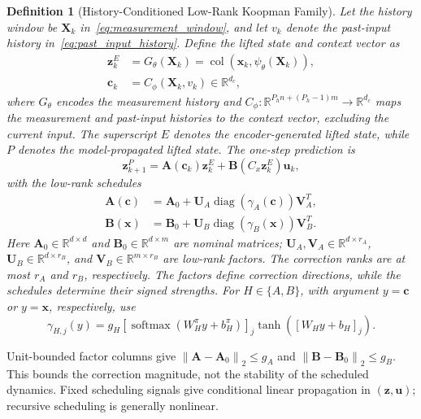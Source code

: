 \documentclass[journal]{IEEEtran}
\newcommand{\vx}{\mathbf{x}}
\newcommand{\vu}{\mathbf{u}}
\newcommand{\vz}{\mathbf{z}}
\newcommand{\vc}{\mathbf{c}}
\newcommand{\mA}{\mathbf{A}}
\newcommand{\mB}{\mathbf{B}}
\newcommand{\mU}{\mathbf{U}}
\newcommand{\mV}{\mathbf{V}}
\newcommand{\mX}{\mathbf{X}}
\newcommand{\R}{\mathbb{R}}
\newcommand{\norm}[1]{\left\lVert #1\right\rVert}
\newcommand{\col}{\operatorname{col}}
\begin{document}
\newtheorem{definition}{Definition}
\begin{definition}[History-Conditioned Low-Rank Koopman Family]
\label{def:hcltk}
Let the history window be $\mX_k$ in~\eqref{eq:measurement_window}, and let $v_k$ denote the past-input history in~\eqref{eq:past_input_history}. Define the lifted state and context vector as
\begin{equation}
\begin{aligned}
\vz_k^E&=G_\theta(\mX_k)=\col(\vx_k,\psi_\theta(\mX_k)),\\
\vc_k&=C_\phi(\mX_k,v_k)\in\R^{d_c},
\end{aligned}
\label{eq:context_vector}
\end{equation}
where $G_\theta$ encodes the measurement history and $C_\phi:\R^{P_hn+(P_h-1)m}\to\R^{d_c}$ maps the measurement and past-input histories to the context vector, excluding the current input. The superscript $E$ denotes the encoder-generated lifted state, while $P$ denotes the model-propagated lifted state. The one-step prediction is
\begin{equation}
\vz_{k+1}^P=\mA(\vc_k)\vz_k^E+\mB(C_x\vz_k^E)\vu_k,
\label{eq:scheduled_predictor}
\end{equation}
with the low-rank schedules
\begin{align}
\mA(\vc)&=\mA_0+\mU_A\operatorname{diag}(\gamma_A(\vc))\mV_A^T,
\label{eq:transition_schedule}\\
\mB(\vx)&=\mB_0+\mU_B\operatorname{diag}(\gamma_B(\vx))\mV_B^T.
\label{eq:low_rank_schedules}
\end{align}
Here $\mA_0\in\R^{d\times d}$ and $\mB_0\in\R^{d\times m}$ are nominal matrices; $\mU_A,\mV_A\in\R^{d\times r_A}$, $\mU_B\in\R^{d\times r_B}$, and $\mV_B\in\R^{m\times r_B}$ are low-rank factors. The correction ranks are at most $r_A$ and $r_B$, respectively. The factors define correction directions, while the schedules determine their signed strengths. For $H\in\{A,B\}$, with argument $y=\vc$ or $y=\vx$, respectively, use
\begin{equation}
\gamma_{H,j}(y)=g_H[\operatorname{softmax}(W_H^\pi y+b_H^\pi)]_j
\tanh([W_Hy+b_H]_j).
\label{eq:A_modulation_coefficients}
\end{equation}
\end{definition}
Unit-bounded factor columns give $\norm{\mA-\mA_0}_2\le g_A$ and $\norm{\mB-\mB_0}_2\le g_B$. This bounds the correction magnitude, not the stability of the scheduled dynamics. Fixed scheduling signals give conditional linear propagation in $(\vz,\vu)$; recursive scheduling is generally nonlinear.
\end{document}
